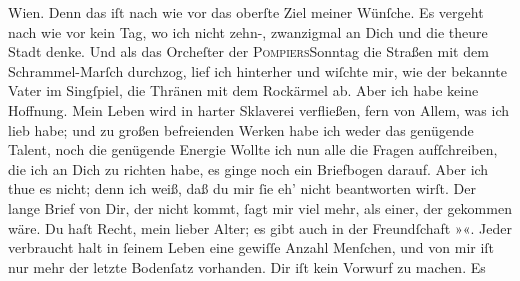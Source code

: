 \begin{ledgroupsized}[t]{13cm}
                  Wien. Denn das iſt nach wie vor das oberſte
               Ziel meiner Wünſche. Es vergeht nach wie vor kein Tag, {\pb}wo ich nicht zehn-, zwanzigmal an Dich und die
               theure Stadt denke. Und als das
                  Orcheſter der \textsc{Pompiers}Sonntag die Straßen mit dem Schrammel-Marſch durchzog, lief ich
               hinterher und wiſchte mir, wie der bekannte Vater im Singſpiel, die Thränen mit dem Rockärmel
               ab. Aber ich habe keine Hoffnung. Mein Leben wird in harter Sklaverei verfließen,
               fern von Allem, was ich lieb habe; und zu großen befreienden Werken habe ich weder
               das genügende Talent, noch die genügende Energie{\dotsfive}\pend
           \pstart
           Wollte ich nun alle die Fragen aufſchreiben, die ich an Dich zu richten habe, es
               ginge noch ein Briefbogen darauf. Aber ich thue es nicht; denn ich weiß, daß du mir
               ſie eh’ nicht beantworten wirſt. Der lange Brief\strikeout{,} von
               Dir, der nicht kommt, ſagt mir viel mehr, als 
               einer, der gekom{\pb}men wäre. Du haſt Recht, mein
               lieber Alter; es gibt auch in der Freundſchaft »\label{K_L02669-45v}\label{K_L02669-45h}«. Jeder verbraucht halt in ſeinem Leben eine gewiſſe Anzahl Menſchen, und von
               mir iſt nur mehr der letzte Bodenſatz vorhanden. Dir iſt kein Vorwurf zu machen. Es

\end{ledgroupsized}
